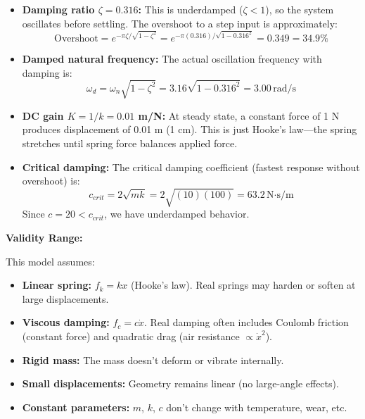 \begin{example}
\begin{itemize}
    \item \textbf{Damping ratio $\zeta = 0.316$:} This is underdamped ($\zeta < 1$), so the system oscillates before settling. The overshoot to a step input is approximately:
    \begin{equation}
    \text{Overshoot} = e^{-\pi\zeta/\sqrt{1-\zeta^2}} = e^{-\pi(0.316)/\sqrt{1-0.316^2}} = 0.349 = 34.9\%
    \end{equation}

    \item \textbf{Damped natural frequency:} The actual oscillation frequency with damping is:
    \begin{equation}
    \omega_d = \omega_n\sqrt{1-\zeta^2} = 3.16\sqrt{1-0.316^2} = 3.00\,\text{rad/s}
    \end{equation}

    \item \textbf{DC gain $K = 1/k = 0.01$ m/N:} At steady state, a constant force of 1 N produces displacement of 0.01 m (1 cm). This is just Hooke's law—the spring stretches until spring force balances applied force.

    \item \textbf{Critical damping:} The critical damping coefficient (fastest response without overshoot) is:
    \begin{equation}
    c_{crit} = 2\sqrt{mk} = 2\sqrt{(10)(100)} = 63.2\,\text{N·s/m}
    \end{equation}
    Since $c = 20 < c_{crit}$, we have underdamped behavior.
\end{itemize}

\textbf{Validity Range:}

This model assumes:
\begin{itemize}
    \item \textbf{Linear spring:} $f_k = kx$ (Hooke's law). Real springs may harden or soften at large displacements.
    \item \textbf{Viscous damping:} $f_c = c\dot{x}$. Real damping often includes Coulomb friction (constant force) and quadratic drag (air resistance $\propto \dot{x}^2$).
    \item \textbf{Rigid mass:} The mass doesn't deform or vibrate internally.
    \item \textbf{Small displacements:} Geometry remains linear (no large-angle effects).
    \item \textbf{Constant parameters:} $m$, $k$, $c$ don't change with temperature, wear, etc.
\end{itemize}


\end{example}
